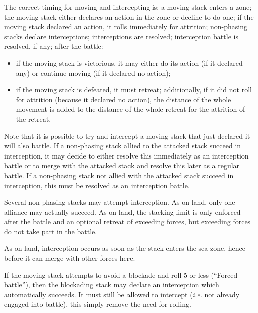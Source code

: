 \aparag The correct timing for moving and intercepting is:
\bparag a moving stack enters a zone;
\bparag the moving stack either declares an action in the zone or decline to
do one;
\bparag if the moving stack declared an action, it rolls immediately for
attrition;
\bparag non-phasing stacks declare interceptions;
\bparag interceptions are resolved;
\bparag interception battle is resolved, if any;
\bparag after the battle:
\begin{itemize}
\item if the moving stack is victorious, it may either do its action (if it
  declared any) or continue moving (if it declared no action);
\item if the moving stack is defeated, it must retreat; additionally, if it
  did not roll for attrition (because it declared no action), the distance of
  the whole movement is added to the distance of the whole retreat for the
  attrition of the retreat.
\end{itemize}

Note that it is possible to try and intercept a moving stack that just
declared it will also battle. If a non-phasing stack allied to the attacked
stack succeed in interception, it may decide to either resolve this
immediately as an interception battle or to merge with the attacked stack and
resolve this later as a regular battle. If a non-phasing stack not allied with
the attacked stack succeed in interception, this must be resolved as an
interception battle.

Several non-phasing stacks may attempt interception. As on land, only one
alliance may actually succeed. As on land, the stacking limit is only enforced
after the battle and an optional retreat of exceeding forces, but exceeding
forces do not take part in the battle.

As on land, interception occurs as soon as the stack enters the sea zone,
hence before it can merge with other forces here.

If the moving stack attempts to avoid a blockade and roll 5 or less (``Forced
battle''), then the blockading stack may declare an interception which
automatically succeeds. It must still be allowed to intercept (\emph{i.e.} not
already engaged into battle), this simply remove the need for rolling.

